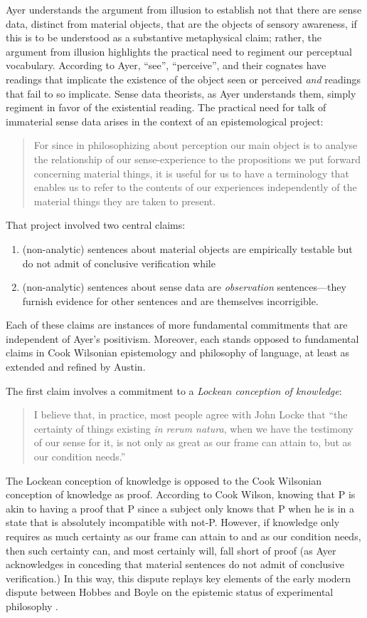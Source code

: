 \documentclass[11pt]{article}
\begin{document}
Ayer understands the argument from illusion to establish not that there are sense data, distinct from material objects, that are the objects of sensory awareness, if this is to be understood as a substantive metaphysical claim; rather, the argument from illusion highlights the practical need to regiment our perceptual vocabulary. According to Ayer, ``see'', ``perceive'', and their cognates have readings that implicate the existence of the object seen or perceived \emph{and} readings that fail to so implicate. Sense data theorists, as Ayer understands them, simply regiment in favor of the existential reading. The practical need for talk of immaterial sense data arises in the context of an epistemological project:
\begin{quote}
    For since in philosophizing about perception our main object is to analyse the relationship of our sense-experience to the propositions we put forward concerning material things, it is useful for us to have a terminology that enables us to refer to the contents of our experiences independently of the material things they are taken to present. \citep[]{Ayer:1958kx}
\end{quote}

That project involved two central claims:
\begin{enumerate}
	\item (non-analytic) sentences about material objects are empirically testable but do not admit of conclusive verification while 
	\item (non-analytic) sentences about sense data are \emph{observation} sentences---\-they furnish evidence for other sentences and are themselves incorrigible. 
\end{enumerate}
Each of these claims are instances of more fundamental commitments that are independent of Ayer's positivism. Moreover, each stands opposed to fundamental claims in Cook Wilsonian epistemology and philosophy of language, at least as extended and refined by Austin.

The first claim involves a commitment to a \emph{Lockean conception of knowledge}:
\begin{quote}
    I believe that, in practice, most people agree with John Locke that ``the certainty of things existing \emph{in rerum natura}, when we have the testimony of our sense for it, is not only as great as our frame can attain to, but as our condition needs.'' \citep[1]{Ayer:1958kx}
\end{quote}
The Lockean conception of knowledge is opposed to the Cook Wilsonian conception of knowledge as proof. According to Cook Wilson, knowing that P is akin to having a proof that P since a subject only knows that P when he is in a state that is absolutely incompatible with not-P. However, if knowledge only requires as much certainty as our frame can attain to and as our condition needs, then such certainty can, and most certainly will, fall short of proof (as Ayer acknowledges in conceding that material sentences do not admit of conclusive verification.) In this way, this dispute replays key elements of the early modern dispute between Hobbes and Boyle on the epistemic status of experimental philosophy \citep[see][for discussion]{Shapin:1985ad}.
\end{document}
